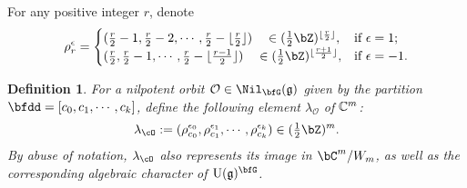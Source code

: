 \documentclass[12pt,a4paper]{amsart}
\newcommand{\CO}{{\mathcal {O}}}
\newcommand{\oU}{\operatorname{U}}
\newcommand{\g}{\mathfrak g}
\numberwithin{equation}{section}
\newtheorem{defn}[thm]{Definition}
\theoremstyle{remark}
\def\half{{\tfrac{1}{2}}}
\def\floor#1{{\lfloor #1 \rfloor}}
\begin{document}

For any positive integer $r$, denote
\[%
  \rho_r^\epsilon
  =\begin{cases}
    (\frac{r}{2}-1, \frac{r}{2}-2,  \cdots, \frac{r}{2} -
    \floor{\frac{r}{2}}) \quad \in (\half\bZ)^{\floor{\frac{r}{2}}}, & \text{if $\epsilon =
      1$};\\
    (\frac{r}{2}, \frac{r}{2}-1, \cdots,
    \frac{r}{2}-\floor{\frac{r-1}{2}})\quad  \in (\half\bZ)^{\floor{\frac{r+1}{2}}},& \text{if $\epsilon = -1$}.
  \end{cases}
\]%



\begin{defn}\label{def:infO}
  For a nilpotent orbit $\CO\in \Nil_{\bfG}(\g)$ given by the partition
  $\bfdd = [c_0,c_1,\cdots, c_k]$, define the following element $\lambda_{\CO}$
  of $\mathbb{C}^m$:
  \[
    \lambda_\cO :
    = (\rho^{\epsilon_0}_{c_0}, \rho^{\epsilon_1}_{c_1},
    \cdots,\rho^{\epsilon_k}_{c_k} ) \in (\half\bZ)^{m}.
  \]
  By abuse of notation, $\lambda_\cO$ also represents its image in $\bC^m/W_m$,
  as well as the corresponding algebraic character of $\oU(\g)^{\bfG}$.
\end{defn}
\end{document}
